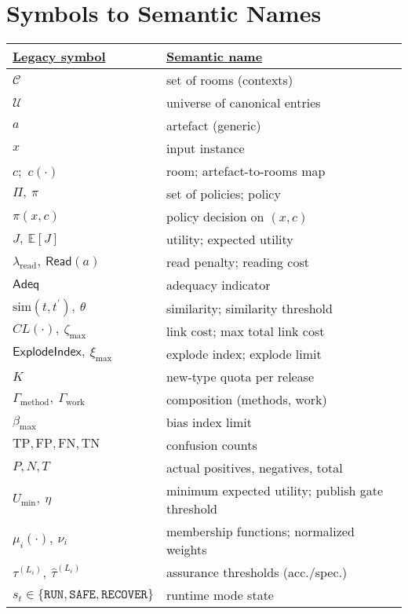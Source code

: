 \documentclass[conference]{IEEEtran}
\begin{document}
\FloatBarrier

\section{Symbols to Semantic Names}
\begin{table}[!hbt]
\centering
\footnotesize
\setlength{\tabcolsep}{3pt}
\renewcommand{\arraystretch}{1.03}
\begin{tabular}{p{.36\linewidth}p{.6\linewidth}}
\underline{Legacy symbol} & \underline{Semantic name} \\
\hline
$\mathcal{C}$ & set of rooms (contexts) \\
$\mathcal{U}$ & universe of canonical entries \\
$a$ & artefact (generic) \\
$x$ & input instance \\
$c$;\ $c(\cdot)$ & room; artefact-to-rooms map \\
$\Pi,\ \pi$ & set of policies; policy \\
$\pi(x,c)$ & policy decision on $(x,c)$ \\
$J,\ \mathbb{E}[J]$ & utility; expected utility \\
$\lambda_{\mathrm{read}},\ \mathsf{Read}(a)$ & read penalty; reading cost \\
$\mathsf{Adeq}$ & adequacy indicator \\
$\mathrm{sim}(t,t^{\prime}),\ \theta$ & similarity; similarity threshold \\
$CL(\cdot),\ \zeta_{\max}$ & link cost; max total link cost \\
$\mathsf{ExplodeIndex},\ \xi_{\max}$ & explode index; explode limit \\
$K$ & new-type quota per release \\
$\Gamma_{\mathrm{method}},\ \Gamma_{\mathrm{work}}$ & composition (methods, work) \\
$\beta_{\max}$ & bias index limit \\
$\mathrm{TP},\mathrm{FP},\mathrm{FN},\mathrm{TN}$ & confusion counts \\
$P,N,T$ & actual positives, negatives, total \\
$U_{\min},\ \eta$ & minimum expected utility; publish gate threshold \\
$\mu_i(\cdot),\ \nu_i$ & membership functions; normalized weights \\
$\tau^{(L_i)},\ \hat{\tau}^{(L_i)}$ & assurance thresholds (acc./spec.) \\
$s_t\in\{\mathtt{RUN},\mathtt{SAFE},\mathtt{RECOVER}\}$ & runtime mode state \\

\end{tabular}
\end{table}
\end{document}

